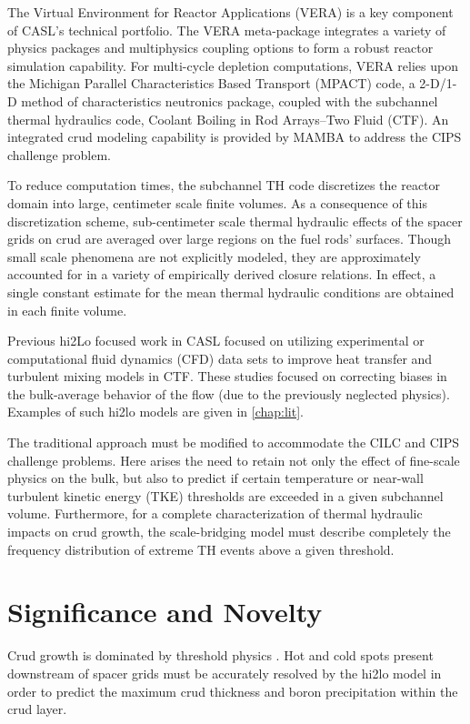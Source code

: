 The Virtual Environment for Reactor Applications (VERA) is a key component of
CASL's technical portfolio.  The VERA meta-package integrates a variety of physics
packages and multiphysics coupling options to form a robust reactor simulation
capability.  For multi-cycle depletion computations, VERA relies upon the Michigan Parallel Characteristics Based Transport (MPACT) code, a
2-D/1-D method of characteristics neutronics package, coupled with the subchannel
thermal hydraulics code, Coolant Boiling in Rod Arrays–Two Fluid (CTF).
An integrated crud modeling capability
is provided by MAMBA to address the CIPS challenge problem.

To reduce computation times, the subchannel TH code discretizes the reactor
domain into large, centimeter scale finite volumes. As a consequence of this
discretization scheme, sub-centimeter scale thermal hydraulic effects of the
spacer grids on crud are averaged over large regions on the fuel rods'
surfaces.  Though small scale phenomena are not explicitly modeled, they are
approximately accounted for in a variety of empirically derived closure
relations.  In effect, a single constant estimate for the mean thermal
hydraulic conditions are obtained in each finite volume.
 

Previous hi2Lo focused work in CASL focused on utilizing experimental or computational fluid dynamics (CFD) data sets to improve heat transfer and turbulent mixing models in CTF.  These studies focused on
correcting biases in the bulk-average behavior of the flow (due to the
previously neglected physics).  Examples of such hi2lo models are given in
\autoref{chap:lit}.

The traditional approach must be modified to accommodate the CILC and CIPS
challenge problems.  Here arises the need to retain not only the effect of
fine-scale physics on the bulk, but also to predict if certain temperature or
near-wall turbulent kinetic energy (TKE) thresholds are exceeded in a given subchannel volume.  Furthermore, for a
complete characterization of thermal hydraulic impacts on crud growth, the
scale-bridging model must describe completely the frequency distribution of
extreme TH events above a given threshold.


\section{Significance and Novelty}

Crud growth is dominated by threshold physics \cite{mongoose17}.  Hot and cold spots
present downstream of spacer grids must be accurately resolved by the hi2lo model
in order to predict the maximum crud
thickness and boron precipitation within the crud layer.

